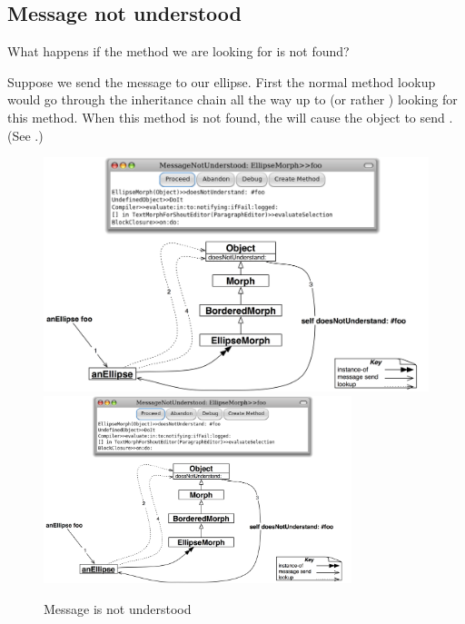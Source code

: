 \documentclass[a4paper,10pt,twoside]{book}
\begin{document}
\subsection{Message not understood}

What happens if the method we are looking for is not found?

Suppose we send the message  to our ellipse.
First the normal method lookup would go through the inheritance chain all the way up to  (or rather ) looking for this method.
When this method is not found, the  will cause the object to send .
(See .)

\begin{figure}[htb]
\begin{center}
\ifluluelse
	{\includegraphics[width=\textwidth]{fooNotFound}}
	{\includegraphics[width=0.8\textwidth]{fooNotFound}}
\caption{Message  is not understood}
\end{center}
\end{figure}
\end{document}
